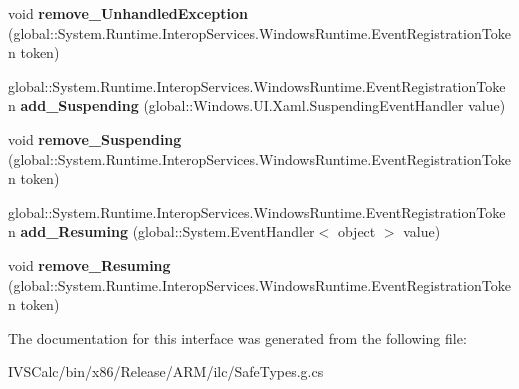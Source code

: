\begin{DoxyCompactItemize}
void {\bfseries remove\+\_\+\+Unhandled\+Exception} (global\+::\+System.\+Runtime.\+Interop\+Services.\+Windows\+Runtime.\+Event\+Registration\+Token token)
\item 
\mbox{\label{interface_windows_1_1_u_i_1_1_xaml_1_1_i_application_ac0c225619b2deaf238efa786fac50afb}} 
global\+::\+System.\+Runtime.\+Interop\+Services.\+Windows\+Runtime.\+Event\+Registration\+Token {\bfseries add\+\_\+\+Suspending} (global\+::\+Windows.\+U\+I.\+Xaml.\+Suspending\+Event\+Handler value)
\item 
\mbox{\label{interface_windows_1_1_u_i_1_1_xaml_1_1_i_application_a2d065fda78dfbe6343b98c8c19648fcf}} 
void {\bfseries remove\+\_\+\+Suspending} (global\+::\+System.\+Runtime.\+Interop\+Services.\+Windows\+Runtime.\+Event\+Registration\+Token token)
\item 
\mbox{\label{interface_windows_1_1_u_i_1_1_xaml_1_1_i_application_adad8e0f1037225acc55bfcc1272edcd4}} 
global\+::\+System.\+Runtime.\+Interop\+Services.\+Windows\+Runtime.\+Event\+Registration\+Token {\bfseries add\+\_\+\+Resuming} (global\+::\+System.\+Event\+Handler$<$ object $>$ value)
\item 
\mbox{\label{interface_windows_1_1_u_i_1_1_xaml_1_1_i_application_a3388b85af6dfd9f47abf5dbfe7274acb}} 
void {\bfseries remove\+\_\+\+Resuming} (global\+::\+System.\+Runtime.\+Interop\+Services.\+Windows\+Runtime.\+Event\+Registration\+Token token)
\end{DoxyCompactItemize}


The documentation for this interface was generated from the following file\+:\begin{DoxyCompactItemize}
\item 
I\+V\+S\+Calc/bin/x86/\+Release/\+A\+R\+M/ilc/Safe\+Types.\+g.\+cs\end{DoxyCompactItemize}

